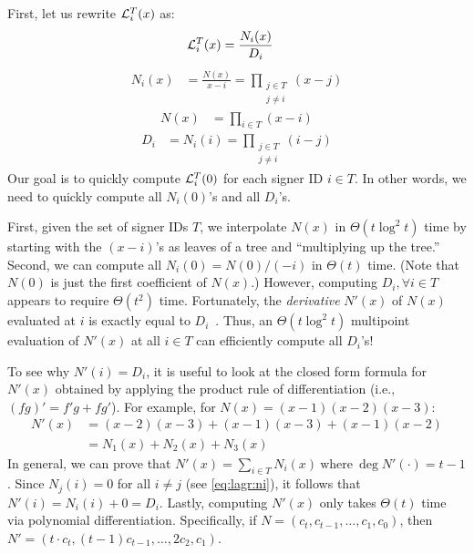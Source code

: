 First, let us rewrite $\mathcal{L}_i^T(x)$ as:
\begin{align}
\mathcal{L}_i^T(x) &= \frac{N_i(x)}{D_i}
\label{eq:lagr:ni}
\end{align}
\begin{align}
N_i(x) &= \frac{N(x)}{x-i} = \prod_{\substack{j\in T\\j\ne i}} {(x-j)}
\end{align}
\begin{align}
N(x) &= \prod_{i\in T}{(x-i)}
\end{align}
\begin{align}
D_i &= N_i(i) = \prod_{\substack{j\in T\\j\ne i}} {(i - j)}
\end{align}
Our goal is to quickly compute $\mathcal{L}_i^T(0)$ for each signer ID $i\in T$.
In other words, we need to quickly compute all $N_i(0)$'s and all $D_i$'s.

First, given the set of signer IDs $T$, we interpolate $N(x)$ in $\Theta(t\log^2{t})$ time by starting with the $(x-i)$'s as leaves of a tree and ``multiplying up the tree.''
Second, we can compute all $N_i(0) = N(0) / (-i)$ in $\Theta(t)$ time.
(Note that $N(0)$ is just the first coefficient of $N(x)$.)
However, computing $D_i,\forall i\in T$ appears to require $\Theta(t^2)$ time.
Fortunately, the \textit{derivative} $N'(x)$ of $N(x)$ evaluated at $i$ is exactly equal to $D_i$~\cite{vG13ModernCh10}.
Thus, an $\Theta(t\log^2{t})$ multipoint evaluation of $N'(x)$ at all $i\in T$ can efficiently compute all $D_i$'s!

To see why $N'(i) = D_i$, it is useful to look at the closed form formula for $N'(x)$ obtained by applying the product rule of differentiation (i.e., $(fg)' = f'g + fg'$).
For example, for $N(x) = (x-1)(x-2)(x-3)$:
\begin{align*}
N'(x)
&= (x-2)(x-3) + (x-1)(x-3) + (x-1)(x-2)\\
&= N_1(x) + N_2(x) + N_3(x)
\end{align*}
In general, we can prove that $N'(x) = \sum_{i\in T} N_i(x)\ \text{where}\ \deg{N'(\cdot)} = t-1$.
Since $N_j(i) = 0$ for all $i\ne j$ (see \cref{eq:lagr:ni}), it follows that $N'(i) = N_i(i) + 0 = D_i$.
Lastly, computing $N'(x)$ only takes $\Theta(t)$ time via polynomial differentiation.
Specifically, if $N = (c_t, c_{t-1}, \dots, c_1, c_0)$, then $N' = (t \cdot c_t, (t-1) c_{t-1}, \dots, 2 c_2, c_1)$.

